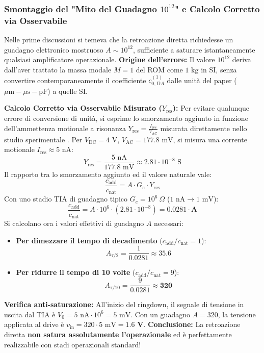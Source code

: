 \documentclass[11pt,a4paper]{article}
\begin{document}
\subsubsection{Smontaggio del "Mito del Guadagno \texorpdfstring{$10^{12}$}{10^12}" e Calcolo Corretto via Osservabile}
\begin{corrbox}
Nelle prime discussioni si temeva che la retroazione diretta richiedesse un guadagno elettronico mostruoso $A \sim 10^{12}$, sufficiente a saturare istantaneamente qualsiasi amplificatore operazionale.
\textbf{Origine dell'errore:} Il valore $10^{12}$ deriva dall'aver trattato la massa modale $M=1$ del ROM come $1\text{ kg}$ in SI, senza convertire contemporaneamente il coefficiente $c_{0,DA}^{(1)}$ dalle unità del paper ($\mu\text{m}-\mu\text{s}-\text{pF}$) a quelle SI.

\textbf{Calcolo Corretto via Osservabile Misurato ($Y_{\text{res}}$):}
Per evitare qualunque errore di conversione di unità, si esprime lo smorzamento aggiunto in funzione dell'ammettenza motionale a risonanza $Y_{\text{res}} = \frac{I_{\text{res}}}{V_{\text{AC}}}$ misurata direttamente nello studio sperimentale \cite{Frangi2023, UniBS2026}.
Per $V_{\text{DC}} = 4\text{ V}$, $V_{\text{AC}} = 177.8\text{ mV}$, si misura una corrente motionale $I_{\text{res}} \approx 5\text{ nA}$:
\begin{equation}
    Y_{\text{res}} = \frac{5\text{ nA}}{177.8\text{ mV}} \approx 2.81 \cdot 10^{-8}\text{ S}
\end{equation}
Il rapporto tra lo smorzamento aggiunto ed il valore naturale vale:
\begin{equation}
    \frac{c_{\text{add}}}{c_{\text{nat}}} = A \cdot G_e \cdot Y_{\text{res}}
\end{equation}
Con uno stadio TIA di guadagno tipico $G_e = 10^6\ \Omega$ ($1\text{ nA} \to 1\text{ mV}$):
\begin{equation}
    \frac{c_{\text{add}}}{c_{\text{nat}}} = A \cdot 10^6 \cdot \left( 2.81 \cdot 10^{-8} \right) = \mathbf{0.0281 \cdot A}
\end{equation}
Si calcolano ora i valori effettivi di guadagno $A$ necessari:
\begin{itemize}
    \item \textbf{Per dimezzare il tempo di decadimento} ($c_{\text{add}}/c_{\text{nat}} = 1$):
    $$A_{\tau/2} = \frac{1}{0.0281} \approx \mathbf{35.6}$$
    \item \textbf{Per ridurre il tempo di 10 volte} ($c_{\text{add}}/c_{\text{nat}} = 9$):
    $$A_{\tau/10} = \frac{9}{0.0281} \approx \mathbf{320}$$
\end{itemize}

\textbf{Verifica anti-saturazione:} All'inizio del ringdown, il segnale di tensione in uscita dal TIA è $V_0 = 5\text{ nA} \cdot 10^6 = 5\text{ mV}$. Con un guadagno $A = 320$, la tensione applicata al drive è $v_{\text{in}} = 320 \cdot 5\text{ mV} = \mathbf{1.6\text{ V}}$.
\textbf{Conclusione:} La retroazione diretta \textbf{non satura assolutamente l'operazionale} ed è perfettamente realizzabile con stadi operazionali standard!
\end{corrbox}
\end{document}
